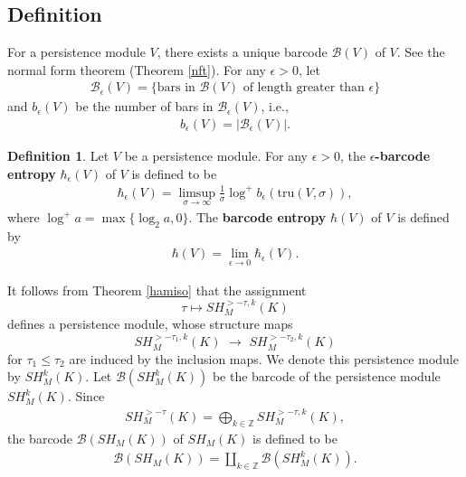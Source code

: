 \documentclass[12pt]{amsart}
\theoremstyle{definition}
\newtheorem{definition}[theorem]{Definition}
\newcommand{\ZZ}{{\mathbb Z}}
\newcommand{\lr}{{\,\,\longrightarrow\,\,}}
\begin{document}
\subsection{Definition}

For a persistence module $V$, there exists a unique barcode $\mathcal{B}(V)$ of $V$. See the normal form theorem (Theorem \ref{nft}). For any $\epsilon>0$, let
\begin{align*}
    \mathcal{B}_{\epsilon}(V) = \{\textrm{bars in}\,\,\mathcal{B}(V)\,\,\textrm{of length greater than}\,\,\epsilon  \}
\end{align*}
and $b_{\epsilon}(V)$ be the number of bars in $\mathcal{B}_{\epsilon}(V)$, i.e.,
\begin{align*}
   b_{\epsilon}(V) = | \mathcal{B}_{\epsilon}(V)|.
\end{align*}
\begin{definition}\label{entro}
    Let $V$ be a persistence module. For any $\epsilon >0$, the \textbf{$\epsilon$-barcode entropy} $\hbar_{\epsilon}(V)$ of $V$ is defined to be
\begin{align*}
    \hbar_{\epsilon}(V) = \limsup_{\sigma \to \infty} \frac{1}{\sigma}\log^+ b_{\epsilon}(\textrm{tru}(V,\sigma)),
\end{align*}
where $\log^+a = \max\{\log_2 a, 0\}$. The \textbf{barcode entropy} $\hbar(V)$ of $V$ is defined by
    \begin{align*}
        \hbar(V) = \lim_{\epsilon \to 0} \hbar_{\epsilon}(V).
    \end{align*}
    \end{definition}

\vspace{0.2 cm}

It follows from Theorem \ref{hamiso} that the assignment
$$\tau \mapsto SH^{>-\tau,k}_M(K)$$ defines a persistence module, whose structure maps
$$SH^{>-\tau_1,k}_M(K) \lr SH^{>-\tau_2,k}_M(K)$$ for $\tau_1 \leq\tau_2$ are induced by the inclusion maps. We denote this persistence module by $SH^k_M(K)$. Let $\mathcal{B}(SH^k_M(K))$ be the barcode of the persistence module $SH^k_M(K)$. Since 
\begin{align*}
    SH^{>-\tau}_M(K) = \bigoplus_{k \in \ZZ} SH^{>-\tau,k}_M(K),
\end{align*}
the barcode $\mathcal{B}(SH_M(K))$ of $SH_M(K)$ is defined to be
\begin{align*}
    \mathcal{B}(SH_M(K)) = \coprod_{k \in \ZZ} \mathcal{B}(SH^k_M(K)).
\end{align*}
\end{document}

